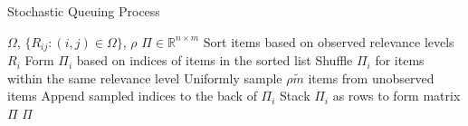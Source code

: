 \documentclass{article}
\def\R{\mathbb{R}}
\def\R{\mathbb{R}}
\begin{document}
\begin{algorithm}[tb]
   \caption{Stochastic Queuing Process}
   \label{alg:sq}
\begin{algorithmic}
    $\Omega$, $\{R_{ij}: (i, j) \in \Omega \}$, $\rho$  
    $\Pi \in \R^{n \times m}$
    \STATE Sort items based on observed relevance levels $R_i$
    \STATE Form $\Pi_i$ based on indices of items in the sorted list
    \STATE Shuffle $\Pi_i$ for items within the same relevance level
        \STATE Uniformly sample $\rho \tilde{m}$ items from unobserved items 
        \STATE Append sampled indices to the back of $\Pi_i$
    \ENDIF
   \ENDFOR 
   \STATE Stack $\Pi_i$ as rows to form matrix $\Pi$
    $\Pi$ 
\end{algorithmic}
\end{algorithm}
\end{document}
